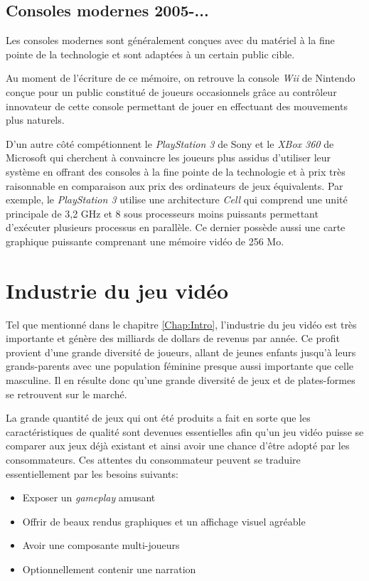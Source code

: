 \documentclass[12pt,twoside,letterpaper,francais]{book}
\begin{document}
\FloatBarrier
\subsection{Consoles modernes 2005-...}
Les consoles modernes sont généralement conçues avec du matériel à la
fine pointe de la technologie et sont adaptées à un certain public
cible.

Au moment de l'écriture de ce mémoire, on retrouve la console
\textit{Wii} de Nintendo conçue pour un public constitué de joueurs
occasionnels grâce au contrôleur innovateur de cette console
permettant de jouer en effectuant des mouvements plus naturels.

D'un autre côté compétionnent le \textit{PlayStation 3} de Sony et le
\textit{XBox 360} de Microsoft qui cherchent à convaincre les joueurs
plus assidus d'utiliser leur système en offrant des consoles à la fine
pointe de la technologie et à prix très raisonnable en comparaison aux
prix des ordinateurs de jeux équivalents. Par exemple, le
\textit{PlayStation 3} utilise une architecture \textit{Cell} qui
comprend une unité principale de 3,2 GHz et 8 sous processeurs moins
puissants permettant d'exécuter plusieurs processus en parallèle. Ce
dernier possède aussi une carte graphique puissante comprenant une
mémoire vidéo de 256 Mo.


\FloatBarrier
\section{Industrie du jeu vidéo}
Tel que mentionné dans le chapitre \ref{Chap:Intro}, l'industrie du
jeu vidéo est très importante et génère des milliards de dollars de
revenus par année. Ce profit provient d'une grande diversité de
joueurs, allant de jeunes enfants jusqu'à leurs grands-parents avec
une population féminine presque aussi importante que celle
masculine. Il en résulte donc qu'une grande diversité de jeux et de
plates-formes se retrouvent sur le marché.

La grande quantité de jeux qui ont été produits a fait en sorte que
les caractéristiques de qualité sont devenues essentielles afin qu'un
jeu vidéo puisse se comparer aux jeux déjà existant et ainsi avoir une
chance d'être adopté par les consommateurs. Ces attentes du
consommateur peuvent se traduire essentiellement par les besoins
suivants:

\begin{itemize}
\item Exposer un \textit{gameplay} amusant
\item Offrir de beaux rendus graphiques et un affichage visuel
  agréable
\item Avoir une composante multi-joueurs
\item Optionnellement contenir une narration 
\end{itemize}
\end{document}
